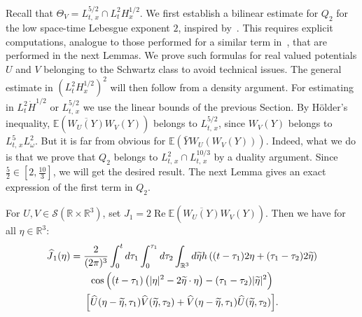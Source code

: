 \documentclass[AHL, Unicode, longabstracts,published]{cedram}
\newcommand{\R}{\mathbb{R}}
\newcommand{\E}{\mathbb{E}}
\DeclareMathOperator{\Rel}{Re}
\newcommand{\mclS}{\mathcal{S}}
\let\oldtilde\tilde
\renewcommand*{\tilde}[1]{\mathchoice{\widetilde{#1}}{\widetilde{#1}}{\oldtilde{#1}}{\oldtilde{#1}}}
\let\oldhat\hat
\renewcommand*{\hat}[1]{\mathchoice{\widehat{#1}}{\widehat{#1}}{\oldhat{#1}}{\oldhat{#1}}}
\begin{document}
Recall that $\Theta_V= L^{5/2}_{t,\,x}\cap L^2_{t}H^{1/2}_x$. We first establish a bilinear estimate for $Q_2$ for the low space-time Lebesgue exponent $2$, inspired by~\cite{lewsab2}. This requires explicit computations, analogue to those performed for a similar term in~\cite{lewsab2}, that are performed in the next Lemmas. We prove such formulas for real valued potentials $U$ and $V$ belonging to the Schwartz class to avoid technical issues. The general estimate in $(L^2_{t}H^{1/2}_x)^2$ will then follow from a density argument. For estimating in $L^2_t\dot H^{1/2}$ or $L^{5/2}_{t,\,x}$ we use the linear bounds of the previous Section. By H\"older's inequality, $\E(\overline{W_U(Y)} W_V(Y))$ belongs to $L^{5/2}_{t,\,x}$, since $W_V(Y)$ belongs to $L^5_{t,\,x} L^2_\omega$. But it is far from obvious for $\E(\bar Y W_U(W_V(Y)))$. Indeed, what we do is that we prove that $Q_2$ belongs to $L^2_{t,\,x}\cap L^{10/3}_{t,\,x}$ by a duality argument. Since $\frac52 \in [2,\frac{10}{3}]$, we will get the desired result. The next Lemma gives an exact expression of the first term in $Q_2$.


\begin{lemm}\label{lem:exprQ21}
For $U,V \in  \mclS(\R\times \R^3)$, set $J_1 = 2\Rel\E(\overline{W_U(Y)} W_V(Y))$. Then we have for all $\eta \in \R^3$:
\begin{multline*}
\hat J_1(\eta) = \frac{2}{(2\pi)^3}\int_{0}^td\tau_1 \int_{0}^{\tau_1}d\tau_2 \int_{\R^3} d\tilde{\eta} h\left((t-\tau_1)2\eta + (\tau_1-\tau_2) 2\tilde{\eta}\right)\\
\cos\Big((t-\tau_1)\left(|\eta|^2-2\tilde{\eta}\cdot \eta\right)-(\tau_1-\tau_2)|\tilde{\eta}|^2 \Big)\\
\Big[\hat U(\eta-\tilde{\eta},\tau_1) \hat V(\tilde{\eta},\tau_2)+ \hat V(\eta-\tilde{\eta},\tau_1) \hat U(\tilde{\eta},\tau_2)\Big].
\end{multline*}
\end{lemm}
\end{document}
